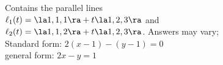 {Contains the parallel lines\\
$\ell_1(t) = \la 1,1,1\ra + t\la 1,2,3\ra$ and \\
$\ell_2(t) = \la 1,1,2\ra + t\la 1,2,3\ra$.
}
{Answers may vary;\\
Standard form: $2(x-1)-(y-1)=0$\\
general form: $2x-y=1$
}

